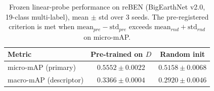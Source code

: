 \begin{table}[t]
\centering
\caption{Frozen linear-probe performance on reBEN (BigEarthNet v2.0, 19-class multi-label), mean $\pm$ std over 3 seeds. The pre-registered criterion is met when $\mathrm{mean}_{pre}-\mathrm{std}_{pre}$ exceeds $\mathrm{mean}_{rnd}+\mathrm{std}_{rnd}$ on micro-mAP.}
\label{tab:probe}
\begin{tabular}{lcc}
\toprule
Metric & Pre-trained on $D$ & Random init \\
\midrule
micro-mAP (primary) & $0.5552 \pm 0.0022$ & $0.5158 \pm 0.0068$ \\
macro-mAP (descriptor) & $0.3366 \pm 0.0004$ & $0.2920 \pm 0.0046$ \\
\bottomrule
\end{tabular}
\end{table}
